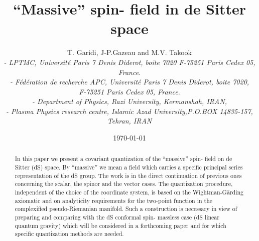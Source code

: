 \documentclass[a4paper,11pt,showpacs,preprintnumbers]{revtex4}
\begin{document}
\title{``Massive'' spin-\coordHE{} field in de Sitter space}

\author{
T. Garidi\coordHE{}, J-P.Gazeau\coordHE{} and M.V. Takook\coordHE{}\\
{\it {}\coordHE{} - LPTMC, Universit\'e Paris 7  Denis Diderot, boite 7020
F-75251 Paris Cedex 05, France.\\
\coordHE{} - F\'ed\'eration de recherche APC, Universit\'e Paris 7
Denis Diderot, boite 7020, \\F-75251 Paris Cedex 05, France.\\
\coordHE{} - Department of Physics, Razi University, Kermanshah, IRAN,\\
\coordHE{} - Plasma Physics research centre, Islamic Azad
University,P.O.BOX 14835-157, Tehran, IRAN }}

\date{\today}%

\begin{abstract}

In this paper we present a covariant quantization of the
``massive'' spin-\coordHE{} field on de Sitter (dS) space. By ``massive''
we mean a field which carries a specific principal series
representation of the dS group. The work is in the direct
continuation of previous ones concerning the scalar, the spinor
and the vector cases. The quantization procedure,  independent of
the choice of the coordinate system, is based on the
Wightman-G\"arding axiomatic and on analyticity requirements for
the two-point function in the complexified pseudo-Riemanian
manifold. Such a construction is necessary in view of preparing
and comparing with the dS conformal spin-\coordHE{} massless case (dS
linear quantum gravity) which will be considered in a forthcoming
paper and for which specific quantization methods are needed.
\end{abstract}


\maketitle\newpage
\end{document}
